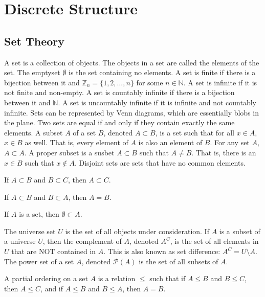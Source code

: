 \chapter{Discrete Structure}
    \section{Set Theory}
        A set is a collection of objects. The objects in a
        set are called the elements of the set. The emptyset
        $\emptyset$ is the set containing no elements. A set
        is finite if there is a bijection between it
        and $\mathbb{Z}_{n}=\{1,2,\hdots,n\}$ for some
        $n\in\mathbb{N}$. A set is infinite if it is
        not finite and non-empty.
        A set is countably infinite if there is a bijection
        between it and $\mathbb{N}$. A set is uncountably
        infinite if it is infinite and not
        countably infinite. Sets can be represented by
        Venn diagrams, which are essentially blobs in
        the plane. Two sets are equal if and only if they
        contain exactly the same elements. A subset $A$ of
        a set $B$, denoted $A\subset{B}$, is a set such that
        for all $x\in{A}$, $x\in{B}$ as well. That is, every
        element of $A$ is also an element of $B$. For any
        set $A$, $A\subset{A}$. A proper subset is a susbet
        $A\subset{B}$ such that $A\ne{B}$. That is, there is
        an $x\in{B}$ such that $x\notin{A}$. Disjoint sets
        are sets that have no common elements.
        \begin{theorem}
            If $A\subset{B}$ and $B\subset{C}$,
            then $A\subset{C}$.
        \end{theorem}
        \begin{theorem}
            If $A\subset{B}$ and $B\subset{A}$, then
            $A=B$.
        \end{theorem}
        \begin{theorem}
            If $A$ is a set, then $\emptyset\subset{A}$.
        \end{theorem}
        The universe set $U$ is the set of all objects under
        consideration. If $A$ is a subset of a universe $U$,
        then the complement of $A$, denoted $A^{C}$, is the
        set of all elements in $U$ that are NOT contained
        in $A$. This is also known as set difference:
        $A^{C}=U\setminus{A}$. The power set of a set $A$,
        denoted $\mathcal{P}(A)$ is the set of all subsets
        of $A$.
        \begin{definition}
            A partial ordering on a set $A$ is a
            relation $\leq$ such that if
            $A\leq{B}$ and $B\leq{C}$, then
            $A\leq{C}$, and if $A\leq{B}$ and
            $B\leq{A}$, then $A=B$.
        \end{definition}
